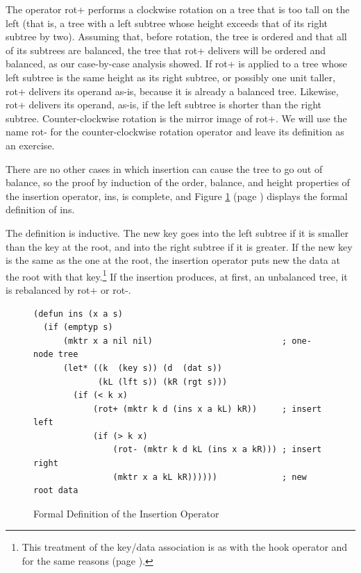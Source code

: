 The operator \textsf{rot}+ performs a clockwise
rotation on a tree that is too tall on the left
(that is, a tree with a left subtree whose height exceeds that
of its right subtree by two).
Assuming that, before rotation,
the tree is ordered and that all of its subtrees are balanced,
the tree that \textsf{rot}+ delivers will be ordered and balanced,
as our case-by-case analysis showed.
If \textsf{rot}+ is applied to a tree whose left subtree
is the same height as its right subtree,
or possibly one unit taller, \textsf{rot}+ delivers its operand as-is,
because it is already a balanced tree.
Likewise, \textsf{rot}+ delivers its operand, as-is,
if the left subtree is shorter than the right subtree.
Counter-clockwise rotation is the mirror image of \textsf{rot}+.
We will use the name \textsf{rot-} for the counter-clockwise rotation operator
and leave its definition as an exercise.

There are no other cases in which insertion
can cause the tree to go out of balance,
so the proof by induction of the
order, balance, and height properties
of the insertion operator, \textsf{ins}, is complete, and
Figure \ref{defun:ins} (page \pageref{defun:ins})
displays the formal definition of \textsf{ins}.

The definition is inductive.
The new key goes into the left subtree
if it is smaller than the key at the root,
and into the right subtree if it is greater.
If the new key is the same as the one at the root,
the insertion operator puts new the data at the root
with that key.\footnote{This treatment
of the key/data association is
as with the \textsf{hook} operator and for the same reasons
(page \pageref{same-key-new-data}).}
If the insertion produces, at first, an unbalanced tree,
it is rebalanced by \textsf{rot}+ or \textsf{rot-}.

\begin{figure}
\begin{center}
\begin{code}
\begin{verbatim}
(defun ins (x a s)
  (if (emptyp s)
      (mktr x a nil nil)                          ; one-node tree
      (let* ((k  (key s)) (d  (dat s))
             (kL (lft s)) (kR (rgt s)))
        (if (< k x)
            (rot+ (mktr k d (ins x a kL) kR))     ; insert left
            (if (> k x)
                (rot- (mktr k d kL (ins x a kR))) ; insert right
                (mktr x a kL kR))))))             ; new root data
\end{verbatim}
\end{code}
\end{center}
\caption{Formal Definition of the Insertion Operator}
\label{defun:ins}
\end{figure}

